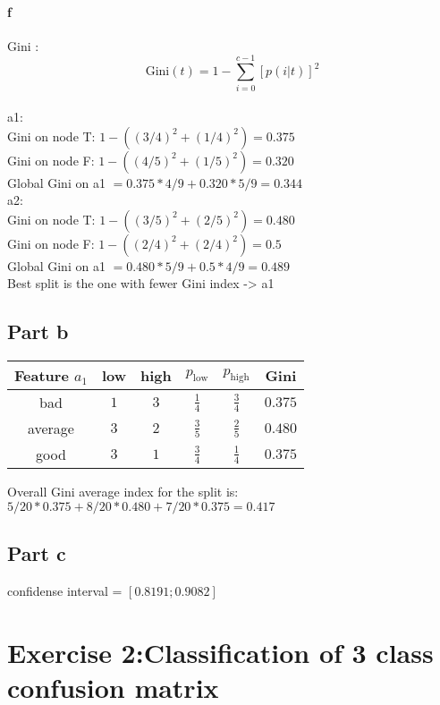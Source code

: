 \documentclass[a4paper, 10pt]{article}
\begin{document}
\paragraph{f}
Gini :
$$
\text{Gini}(t) = 1 - \sum_{i=0}^{c-1} [p(i\vert t)]^2
$$
\\
a1:
\\
Gini on node T: $1- ((3/4)^2 + (1/4)^2) = 0.375 $
\\
Gini on node F: $1-((4/5)^2 + (1/5)^2) = 0.320$
\\
Global Gini on a1 $= 0.375*4/9 + 0.320*5/9 = 0.344 $ 
\\
a2:
\\
Gini on node T: $1- ((3/5)^2 + (2/5)^2) = 0.480 $
\\
Gini on node F: $1- ((2/4)^2 + (2/4)^2) = 0.5 $
\\
Global Gini on a1 $= 0.480*5/9 + 0.5*4/9 = 0.489 $ 
\\
Best split is the one with fewer Gini index -> a1

\subsection{Part b}
\begin{center}
    \begin{tabular}{ |c|c|c|c|c|c| }
        \hline
        Feature $a_1$ & low      & high     & $p_\text{low}$    & $p_\text{high}$ & Gini\\
        \hline
        bad          & $1$      & $3$       & $\frac{1}{4}$     & $\frac{3}{4}$ & $0.375$\\
        \hline
        average      & $3$      & $2$       & $\frac{3}{5}$     & $\frac{2}{5}$ & $0.480$\\
        \hline
        good         & $3$      & $1$       & $\frac{3}{4}$     & $\frac{1}{4}$ & $0.375$\\
        \hline
    \end{tabular}
\end{center}
Overall Gini average index for the split is: $ 5/20*0.375 + 8/20*0.480 + 7/20*0.375 = 0.417$

\subsection{Part c}
confidense interval = $[0.8191; 0.9082]$

\section{Exercise 2:Classification of 3 class confusion matrix}
\end{document}
